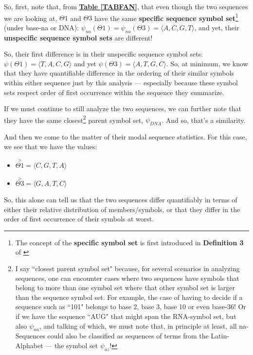 \documentclass[a4paper, 18pt]{book} %
\begin{document}
So, first, note that, from \textbf{\hyperref[TABFAN]{Table \ref{TABFAN}}}, that even though the two sequences we are looking at, $\Theta1$ and $\Theta3$ have the same \textbf{specific sequence symbol set}\footnote{The concept of the \textbf{specific symbol set} is first introduced in \textbf{Definition 3} of \cite{ossipaper}} (under base-na or DNA): $\psi_{na}(\Theta1) = \psi_{na}(\Theta3) = \langle A, C, G, T \rangle$, and yet, their \textbf{unspecific sequence symbol sets} are different! 

So, their first difference is in their unspecific sequence symbol sets: $\psi(\Theta1) = \langle T, A, C, G\rangle$ and yet $\psi(\Theta3) = \langle A, T, G, C\rangle$. So, at minimum, we know that they have quantifiable difference in the ordering of their similar symbols within either sequence just by this analysis --- especially because these symbol sets respect order of first occurrence within the sequence they summarize.

If we must continue to still analyze the two sequences, we can further note that they have the same closest\footnote{I say ``closest parent symbol set" because, for several scenarios in analyzing sequences, one can encounter cases where two sequences have symbols that belong to more than one symbol set where that other symbol set is larger than the sequence symbol set. For example, the case of having to decide if a sequence such as ``101" belongs to base 2, base 3, base 10 or even base-36! Or if we have the sequence ``AUG" that might span the RNA-symbol set, but also $\psi_{na}$, and talking of which, we must note that, in principle at least, all na-Sequences could also be classified as sequences of terms from the Latin-Alphabet --- the symbol set $\psi_{az}$!} parent symbol set, $\psi_{DNA}$. And so, that's a similarity.

And then we come to the matter of their modal sequence statistics. For this case, we see that we have the values: 

\begin{itemize}
\item $\overset{>}{\Theta1} = \langle C, G, T, A \rangle$
\item $\overset{>}{\Theta3} = \langle G, A, T, C \rangle$
\end{itemize}

So, this alone can tell us that the two sequences differ quantifiably in terms of either their relative distribution of members/symbols, or that they differ in the order of first occurrence of their symbols at worst.
\end{document}

